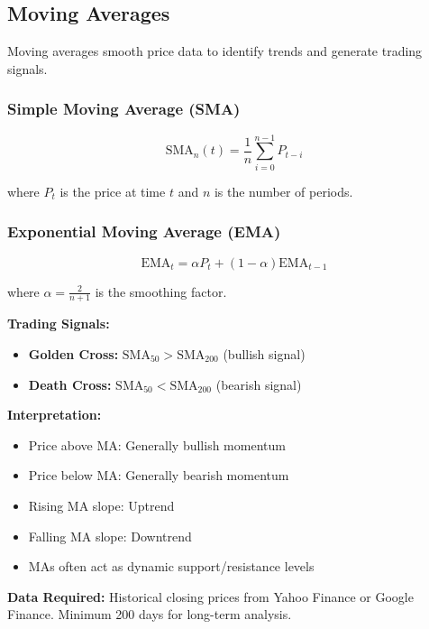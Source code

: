 \documentclass[11pt,a4paper]{article}
\begin{document}
\subsection{Moving Averages}

Moving averages smooth price data to identify trends and generate trading signals.

\subsubsection{Simple Moving Average (SMA)}

\begin{equation}
\text{SMA}_n(t) = \frac{1}{n}\sum_{i=0}^{n-1} P_{t-i}
\end{equation}

where $P_t$ is the price at time $t$ and $n$ is the number of periods.

\subsubsection{Exponential Moving Average (EMA)}

\begin{equation}
\text{EMA}_t = \alpha P_t + (1-\alpha)\text{EMA}_{t-1}
\end{equation}

where $\alpha = \frac{2}{n+1}$ is the smoothing factor.

\textbf{Trading Signals:}
\begin{itemize}
    \item \textbf{Golden Cross:} $\text{SMA}_{50} > \text{SMA}_{200}$ (bullish signal)
    \item \textbf{Death Cross:} $\text{SMA}_{50} < \text{SMA}_{200}$ (bearish signal)
\end{itemize}

\textbf{Interpretation:}
\begin{itemize}
    \item Price above MA: Generally bullish momentum
    \item Price below MA: Generally bearish momentum
    \item Rising MA slope: Uptrend
    \item Falling MA slope: Downtrend
    \item MAs often act as dynamic support/resistance levels
\end{itemize}

\textbf{Data Required:} Historical closing prices from Yahoo Finance or Google Finance. Minimum 200 days for long-term analysis.
\end{document}

